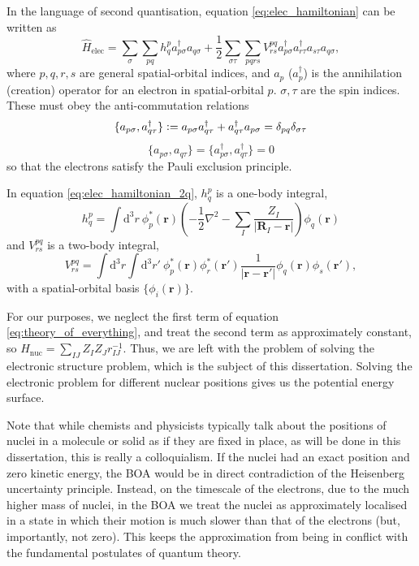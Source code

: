 In the language of second quantisation, equation \ref{eq:elec_hamiltonian} can be written as
\begin{equation}
\label{eq:elec_hamiltonian_2q}
\hat H_\mathrm{elec} = \sum_\sigma\sum_{pq} h^p_{q}a_{p\sigma}^\dag a_{q\sigma}+\frac 12 \sum_{\sigma\tau}\sum_{pqrs} V^{pq}_{rs}a_{p\sigma}^\dag a_{r\tau}^\dag a_{s\tau}a_{q\sigma},
\end{equation}
where $p,q,r,s$ are general spatial-orbital indices, and $a_{p}$ ($a_{p}^\dag$) is the annihilation (creation) operator for an electron in spatial-orbital $p$. $\sigma,\tau$ are the spin indices. These must obey the anti-commutation relations
\begin{equation}
    \{a_{p\sigma},a_{q\tau}^\dag\}
    \mathrel{\mathop:}=
    a_{p\sigma}a_{q\tau}^\dag + a_{q\tau}^\dag a_{p\sigma}
    =\delta_{pq}\delta_{\sigma\tau}
\end{equation}
\begin{equation}
    \{a_{p\sigma},a_{q\tau}\} = \{a_{p\sigma}^\dag,a_{q\tau}^\dag\} = 0
\end{equation}
so that the electrons satisfy the Pauli exclusion principle.

In equation \ref{eq:elec_hamiltonian_2q}, $h^p_{q}$ is a one-body integral,
\begin{equation}
\label{eq:hij}
h^p_{q} = \int \mathrm{d}^3r\ \phi_p^*(\mathbf{r})\left(-\frac 12 \nabla^2 - \sum_I \frac{Z_I}{|\mathbf{R}_I-\mathbf r|}\right)\phi_q(\mathbf{r})
\end{equation}
and $V^{pq}_{rs}$ is a two-body integral,
\begin{equation}
    V^{pq}_{rs} = \int \mathrm{d}^3r\int\mathrm{d}^3r'\ \phi_p^*(\mathbf{r})\phi_r^*(\mathbf{r}')\frac{1}{|\mathbf{r}-\mathbf{r}'|}\phi_q(\mathbf{r})\phi_s(\mathbf{r}'),
\end{equation}
with a spatial-orbital basis $\{\phi_i(\mathbf{r})\}$.

For our purposes, we neglect the first term of equation \ref{eq:theory_of_everything}, and treat the second term as approximately constant, so $\hat H_\mathrm{nuc} = \sum_{IJ} Z_IZ_Jr_{IJ}^{-1}$. Thus, we are left with the problem of solving the electronic structure problem, which is the subject of this dissertation. Solving the electronic problem for different nuclear positions gives us the potential energy surface.

Note that while chemists and physicists typically talk about the positions of nuclei in a molecule or solid as if they are fixed in place, as will be done in this dissertation, this is really a colloquialism. If the nuclei had an exact position and zero kinetic energy, the \gls{BOA} would be in direct contradiction of the Heisenberg uncertainty principle. Instead, on the timescale of the electrons, due to the much higher mass of nuclei, in the \gls{BOA} we treat the nuclei as approximately localised in a state in which their motion is much slower than that of the electrons (but, importantly, not zero). This keeps the approximation from being in conflict with the fundamental postulates of quantum theory.

